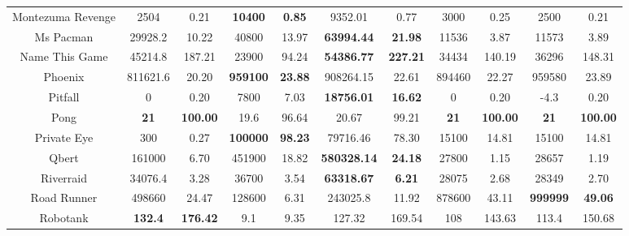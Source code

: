 \documentclass[nohyperref]{article}
\newcommand{\best}[1]{\textbf{#1}}
\theoremstyle{plain}
\begin{document}
\begin{table}[!hb]
\begin{center}
\begin{tabular}{|c| c c| c c| c c| c c| c c| }
 Montezuma Revenge  & 2504              & 0.21        & \textbf{10400}  & \textbf{0.85}           &9352.01               &0.77           &3000              &0.25    &2500            &0.21    \\
 Ms Pacman          & 29928.2           & 10.22       & 40800           & 13.97          & \textbf{63994.44}    &\textbf{21.98}          &11536             &3.87    &11573           &3.89    \\
 Name This Game     & 45214.8           & 187.21      & 23900           & 94.24          &\textbf{54386.77}     &\textbf{227.21}         &34434             &140.19  &36296           &148.31    \\
 Phoenix            & 811621.6          & 20.20       & \textbf{959100} & \textbf{23.88}          &908264.15             &22.61          &894460            &22.27   &959580          &23.89    \\
 Pitfall            & 0                 & 0.20        & 7800            & 7.03           &\textbf{18756.01}     &\textbf{16.62}          &0                 &0.20    &-4.3            &0.20    \\
 Pong               & \textbf{21}       & \textbf{100.00}      & 19.6            & 96.64          & 20.67                &99.21          &\best{21}         &\textbf{100.00} &\textbf{21}      &\textbf{100.00}      \\
 Private Eye        & 300               & 0.27        & \textbf{100000} & \textbf{98.23}          & 79716.46             &78.30          &15100             &14.81   &15100           &14.81    \\
 Qbert              & 161000            & 6.70        & 451900          & 18.82          &\textbf{580328.14}    &\textbf{24.18}          &27800             &1.15    &28657           &1.19   \\
 Riverraid          & 34076.4           & 3.28        & 36700           & 3.54           & \textbf{63318.67}    &\textbf{6.21}           &28075             &2.68    &28349           &2.70    \\
 Road Runner        & 498660            & 24.47       & 128600          & 6.31           & 243025.8             &11.92          &878600     &43.11   &\textbf{999999}          &\textbf{49.06}    \\
 Robotank           & \textbf{132.4}    & \textbf{176.42}      & 9.1             & 9.35           &127.32                &169.54         &108               &143.63  &113.4           &150.68    \\

\end{tabular}
\end{center}
\end{table}
\end{document}
